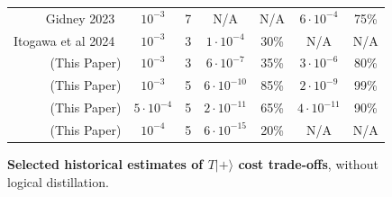 \documentclass[onecolumn,unpublished,a4paper]{quantumarticle}
\theoremstyle{definition}
\begin{document}
\begin{figure}
{\begin{tabular}{|r|c|c||c|c||c|c|}
         Gidney 2023~\cite{gidney2023hook}
            &$10^{-3}$
            &7
            &N/A
            &N/A
            
            &$6 \cdot 10^{-4}$
            &75\%

            \\
         Itogawa et al 2024~\cite{itogawa2024zeroleveldistilldistill}   
            &$10^{-3}$
            &3
            
            &$1 \cdot 10^{-4}$

            &30\%

            &N/A
            &N/A
            \\
         \hline
         (This Paper) 
            &$10^{-3}$
            &3
            &$6 \cdot 10^{-7}$
            &35\%
            &$3 \cdot 10^{-6}$
            &80\%
            \\
         (This Paper) 
            &$10^{-3}$
            &5
            &$6 \cdot 10^{-10}$
            &85\%
            &$2 \cdot 10^{-9}$
            &99\%
            \\
         (This Paper) 
            &${5 \cdot 10^{-4}}$
            &5
            &$2 \cdot 10^{-11}$
            &65\%
            &$4 \cdot 10^{-11}$
            &90\%
            \\
         (This Paper) 
            &${10^{-4}}$
            &5
            &$6 \cdot 10^{-15}$
            &20\%
            &N/A
            &N/A
            \\
         \hline
    \end{tabular}
    }
    \caption{
        \textbf{Selected historical estimates of $T|+\rangle$ cost trade-offs}, without logical distillation.
    }
    \label{fig:historical-comparison}
\end{figure}
\clearpage
\end{document}
